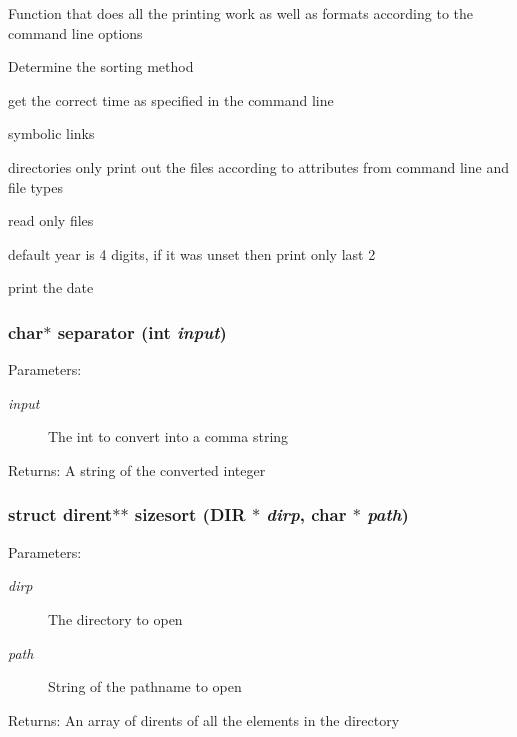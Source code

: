 Function that does all the printing work as well as formats according to the command line options

Determine the sorting method

get the correct time as specified in the command line

symbolic links

directories only print out the files according to attributes from command line and file types

read only files

default year is 4 digits, if it was unset then print only last 2

print the date 
\subsubsection{\setlength{\rightskip}{0pt plus 5cm}char$\ast$ separator (int {\em input})}\label{dir_8h_39dc54c3a499efadd208cc6482f2034f}


\begin{Desc}
\item[Parameters:]
\begin{description}
\item[{\em input}]The int to convert into a comma string \end{description}
\end{Desc}
\begin{Desc}
\item[Returns:]A string of the converted integer \end{Desc}
\subsubsection{\setlength{\rightskip}{0pt plus 5cm}struct dirent$\ast$$\ast$ sizesort (DIR $\ast$ {\em dirp}, char $\ast$ {\em path})}\label{dir_8h_57b505a098447a3e63c6f3528cfe7508}


\begin{Desc}
\item[Parameters:]
\begin{description}
\item[{\em dirp}]The directory to open \item[{\em path}]String of the pathname to open \end{description}
\end{Desc}
\begin{Desc}
\item[Returns:]An array of dirents of all the elements in the directory \end{Desc}
